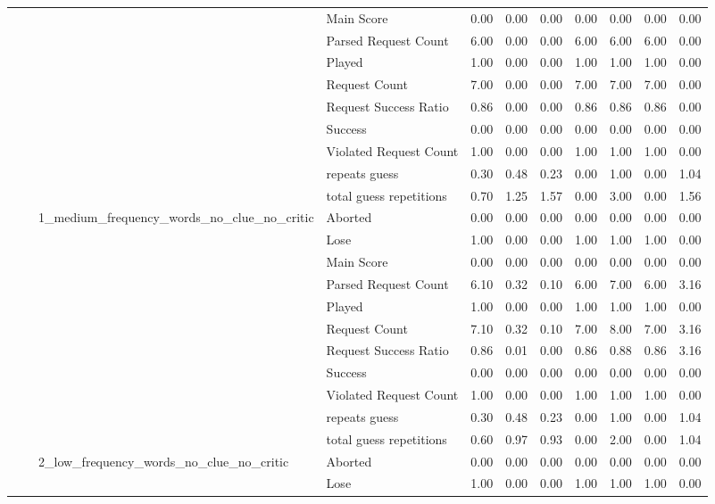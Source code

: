 \begin{tabular}{llllrrrrrrr}
 &  &  & Main Score & 0.00 & 0.00 & 0.00 & 0.00 & 0.00 & 0.00 & 0.00 \\
 &  &  & Parsed Request Count & 6.00 & 0.00 & 0.00 & 6.00 & 6.00 & 6.00 & 0.00 \\
 &  &  & Played & 1.00 & 0.00 & 0.00 & 1.00 & 1.00 & 1.00 & 0.00 \\
 &  &  & Request Count & 7.00 & 0.00 & 0.00 & 7.00 & 7.00 & 7.00 & 0.00 \\
 &  &  & Request Success Ratio & 0.86 & 0.00 & 0.00 & 0.86 & 0.86 & 0.86 & 0.00 \\
 &  &  & Success & 0.00 & 0.00 & 0.00 & 0.00 & 0.00 & 0.00 & 0.00 \\
 &  &  & Violated Request Count & 1.00 & 0.00 & 0.00 & 1.00 & 1.00 & 1.00 & 0.00 \\
 &  &  & repeats guess & 0.30 & 0.48 & 0.23 & 0.00 & 1.00 & 0.00 & 1.04 \\
 &  &  & total guess repetitions & 0.70 & 1.25 & 1.57 & 0.00 & 3.00 & 0.00 & 1.56 \\
\cline{3-11}
 &  & \multirow[t]{11}{*}{1_medium_frequency_words_no_clue_no_critic} & Aborted & 0.00 & 0.00 & 0.00 & 0.00 & 0.00 & 0.00 & 0.00 \\
 &  &  & Lose & 1.00 & 0.00 & 0.00 & 1.00 & 1.00 & 1.00 & 0.00 \\
 &  &  & Main Score & 0.00 & 0.00 & 0.00 & 0.00 & 0.00 & 0.00 & 0.00 \\
 &  &  & Parsed Request Count & 6.10 & 0.32 & 0.10 & 6.00 & 7.00 & 6.00 & 3.16 \\
 &  &  & Played & 1.00 & 0.00 & 0.00 & 1.00 & 1.00 & 1.00 & 0.00 \\
 &  &  & Request Count & 7.10 & 0.32 & 0.10 & 7.00 & 8.00 & 7.00 & 3.16 \\
 &  &  & Request Success Ratio & 0.86 & 0.01 & 0.00 & 0.86 & 0.88 & 0.86 & 3.16 \\
 &  &  & Success & 0.00 & 0.00 & 0.00 & 0.00 & 0.00 & 0.00 & 0.00 \\
 &  &  & Violated Request Count & 1.00 & 0.00 & 0.00 & 1.00 & 1.00 & 1.00 & 0.00 \\
 &  &  & repeats guess & 0.30 & 0.48 & 0.23 & 0.00 & 1.00 & 0.00 & 1.04 \\
 &  &  & total guess repetitions & 0.60 & 0.97 & 0.93 & 0.00 & 2.00 & 0.00 & 1.04 \\
\cline{3-11}
 &  & \multirow[t]{11}{*}{2_low_frequency_words_no_clue_no_critic} & Aborted & 0.00 & 0.00 & 0.00 & 0.00 & 0.00 & 0.00 & 0.00 \\
 &  &  & Lose & 1.00 & 0.00 & 0.00 & 1.00 & 1.00 & 1.00 & 0.00 \\

\end{tabular}
